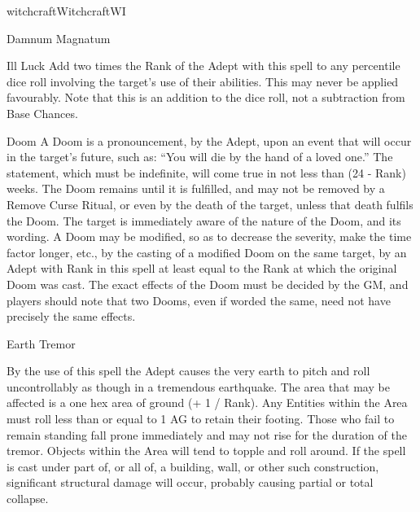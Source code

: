 \begin{college}[1.1]{witchcraft}{Witchcraft}{WI}
\begin{spell}[S-10]{Damnum Magnatum}
\begin{effects}
\begin{Description}
\item[Ill Luck]
Add two times the Rank of the Adept with this spell to any percentile
dice roll involving the target's use of their abilities.  This may
never be applied favourably.  Note that this is an addition to the
dice roll, not a subtraction from Base Chances.

\item[Doom]
A Doom is a pronouncement, by the Adept, upon an event that will occur
in the target's future, such as: ``You will die by the hand of a loved
one.''  The statement, which must be indefinite, will come true in not
less than (24 - Rank) weeks.  The Doom remains until it is fulfilled,
and may not be removed by a Remove Curse Ritual, or even by the death
of the target, unless that death fulfils the Doom.  The target is
immediately aware of the nature of the Doom, and its wording.  A Doom
may be modified, so as to decrease the severity, make the time factor
longer, etc., by the casting of a modified Doom on the same target, by
an Adept with Rank in this spell at least equal to the Rank at which
the original Doom was cast.  The exact effects of the Doom must be
decided by the GM, and players should note that two Dooms, even if
worded the same, need not have precisely the same effects.
\end{Description}
\end{effects}
\end{spell}

\begin{spell}[S-11]{Earth Tremor}

\begin{effects}
By the use of this spell the Adept causes the very earth to pitch and
roll uncontrollably as though in a tremendous earthquake.  The area
that may be affected is a one hex area of ground (+ 1 / Rank).  Any
Entities within the Area must roll less than or equal to 1 \x AG to
retain their footing.  Those who fail to remain standing fall prone
immediately and may not rise for the duration of the tremor.  Objects
within the Area will tend to topple and roll around.  If the spell is
cast under part of, or all of, a building, wall, or other such
construction, significant structural damage will occur, probably
causing partial or total collapse.
\end{effects}
\end{spell}


\end{college}
